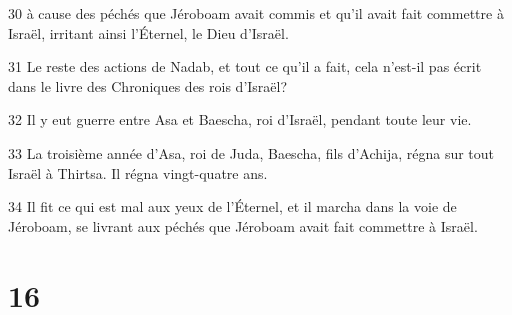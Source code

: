 \par 30 à cause des péchés que Jéroboam avait commis et qu'il avait fait commettre à Israël, irritant ainsi l'Éternel, le Dieu d'Israël.
\par 31 Le reste des actions de Nadab, et tout ce qu'il a fait, cela n'est-il pas écrit dans le livre des Chroniques des rois d'Israël?
\par 32 Il y eut guerre entre Asa et Baescha, roi d'Israël, pendant toute leur vie.
\par 33 La troisième année d'Asa, roi de Juda, Baescha, fils d'Achija, régna sur tout Israël à Thirtsa. Il régna vingt-quatre ans.
\par 34 Il fit ce qui est mal aux yeux de l'Éternel, et il marcha dans la voie de Jéroboam, se livrant aux péchés que Jéroboam avait fait commettre à Israël.

\chapter{16}

